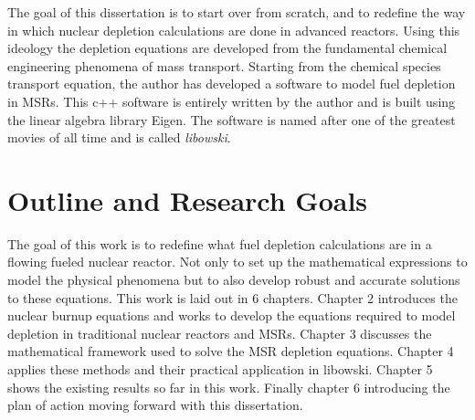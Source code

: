 The goal of this dissertation is to start over from scratch, and to redefine the way in which nuclear depletion calculations are done in advanced reactors. Using this ideology the depletion equations are developed from the fundamental chemical engineering phenomena of mass transport. Starting from the chemical species transport equation, the author has developed a software to model fuel depletion in MSRs. This c++ software is entirely written by the author and is built using the linear algebra library Eigen. The software is named after one of the greatest movies of all time and is called \textit{libowski}.

\section{Outline and Research Goals}

The goal of this work is to redefine what fuel depletion calculations are in a flowing fueled nuclear reactor. Not only to set up the mathematical expressions to model the physical phenomena but to also develop robust and accurate solutions to these equations. This work is laid out in 6 chapters. Chapter 2 introduces the nuclear burnup equations and works to develop the equations required to model depletion in traditional nuclear reactors and MSRs. Chapter 3 discusses the mathematical framework used to solve the MSR depletion equations. Chapter 4 applies these methods  and their practical application in libowski. Chapter 5 shows the existing results so far in this work. Finally chapter 6 introducing the plan of action moving forward with this dissertation. 